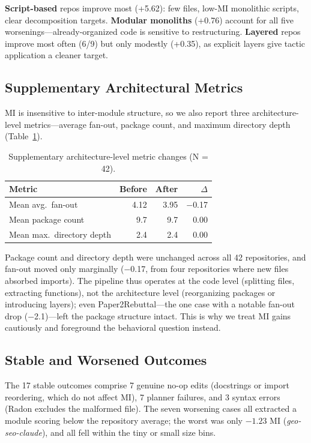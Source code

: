 \documentclass[runningheads]{llncs}
\begin{document}
\textbf{Script-based} repos improve most (+5.62): few files, low-MI monolithic scripts, clear decomposition targets. \textbf{Modular monoliths} (+0.76) account for all five worsenings---already-organized code is sensitive to restructuring. \textbf{Layered} repos improve most often (6/9) but only modestly (+0.35), as explicit layers give tactic application a cleaner target.

\subsection{Supplementary Architectural Metrics}

MI is insensitive to inter-module structure, so we also report three architecture-level metrics---average fan-out, package count, and maximum directory depth (Table~\ref{tab:exp5_supp}).

\begin{table}[H]
\centering
\small
\caption{Supplementary architecture-level metric changes (N = 42).}
\label{tab:exp5_supp}
\begin{tabular}{lrrr}
\toprule
\textbf{Metric} & \textbf{Before} & \textbf{After} & \textbf{$\Delta$} \\
\midrule
Mean avg.\ fan-out        & 4.12 & 3.95 & $-$0.17 \\
Mean package count        & 9.7  & 9.7  & 0.00 \\
Mean max.\ directory depth & 2.4  & 2.4  & 0.00 \\
\bottomrule
\end{tabular}
\end{table}

Package count and directory depth were unchanged across all 42 repositories, and fan-out moved only marginally ($-$0.17, from four repositories where new files absorbed imports). The pipeline thus operates at the code level (splitting files, extracting functions), not the architecture level (reorganizing packages or introducing layers); even Paper2Rebuttal---the one case with a notable fan-out drop ($-$2.1)---left the package structure intact. This is why we treat MI gains cautiously and foreground the behavioral question instead.

\subsection{Stable and Worsened Outcomes}

The 17 stable outcomes comprise 7 genuine no-op edits (docstrings or import reordering, which do not affect MI), 7 planner failures, and 3 syntax errors (Radon excludes the malformed file). The seven worsening cases all extracted a module scoring below the repository average; the worst was only $-1.23$ MI (\textit{geo-seo-claude}), and all fell within the tiny or small size bins.
\end{document}
